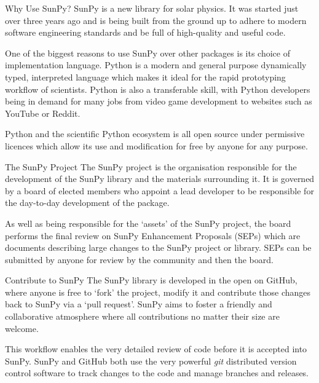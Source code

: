 \documentclass[a0paper,portrait]{baposter}
\begin{document}
\begin{poster}
\begin{posterbox}[name=why,column=2,below=sunpy]{Why Use SunPy?}
SunPy is a new library for solar physics. It was started just over three years ago and is being built from the ground up to adhere to modern software engineering standards and be full of high-quality and useful code.

One of the biggest reasons to use SunPy over other packages is its choice of implementation language.
Python is a modern and general purpose dynamically typed, interpreted language which makes it ideal for the rapid prototyping workflow of scientists. 
Python is also a transferable skill, with Python developers being in demand for many jobs from video game development to websites such as YouTube or Reddit.

Python and the scientific Python ecosystem is all open source under permissive licences which allow its use and modification for free by anyone for any purpose.
\end{posterbox}

\begin{posterbox}[name=project,column=2,below=why]{The SunPy Project}
The SunPy project is the organisation responsible for the development of the SunPy library and the materials surrounding it.
It is governed by a board of elected members who appoint a lead developer to be responsible for the day-to-day development of the package.

As well as being responsible for the `assets' of the SunPy project, the board performs the final review on SunPy Enhancement Proposals (SEPs) which are documents describing large changes to the SunPy project or library. SEPs can be submitted by anyone for review by the community and then the board.
\end{posterbox}

\begin{posterbox}[name=development,column=2,below=project]{Contribute to SunPy}
The SunPy library is developed in the open on GitHub, where anyone is free to `fork' the project, modify it and contribute those changes back to SunPy via a `pull request'.
SunPy aims to foster a friendly and collaborative atmosphere where all contributions no matter their size are welcome.

This workflow enables the very detailed review of code before it is accepted into SunPy.
SunPy and GitHub both use the very powerful \textit{git} distributed version control software to track changes to the code and manage branches and releases.
\end{posterbox}


\end{poster}
\end{document}

